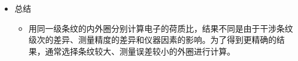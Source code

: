 \documentclass[dvipsnames, svgnames,a4paper,11pt]{article}
\begin{document}
\begin{itemize}
\begin{itemize}
\begin{enumerate}
				\item 仪器因素：
				\begin{itemize}
					\item F-P标准具的分辨率和精细度可能会影响内外圈条纹的清晰度和测量精度。
					\item 仪器调整、光源稳定性等因素也会对测量结果产生影响。
				\end{itemize}
			\end{enumerate}
		\end{itemize}
		
		\item 总结
		\begin{itemize}
			\item 用同一级条纹的内外圈分别计算电子的荷质比，结果不同是由于干涉条纹级次的差异、测量精度的差异和仪器因素的影响。为了得到更精确的结果，通常选择条纹较大、测量误差较小的外圈进行计算。
		\end{itemize}
	\end{itemize}
	
\end{document}

